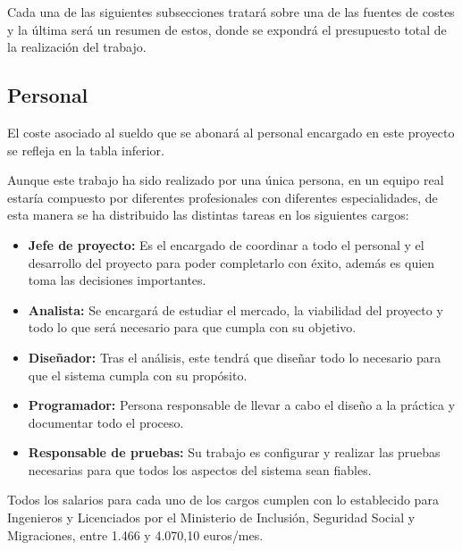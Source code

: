 Cada una de las siguientes subsecciones tratará sobre una de las fuentes de costes y la última será un resumen de estos, donde se expondrá el presupuesto total de la realización del trabajo.

\subsection{Personal}
El coste asociado al sueldo que se abonará al personal encargado en este proyecto se refleja en la tabla inferior.

Aunque este trabajo ha sido realizado por una única persona, en un equipo real estaría compuesto por diferentes profesionales con diferentes especialidades, de esta manera se ha distribuido las distintas tareas en los siguientes cargos:
\begin{itemize}
	\item \textbf{Jefe de proyecto:} Es el encargado de coordinar a todo el personal y el desarrollo del proyecto para poder completarlo con éxito, además es quien toma las decisiones importantes.
	\item \textbf{Analista:} Se encargará de estudiar el mercado, la viabilidad del proyecto y todo lo que será necesario para que cumpla con su objetivo.
	\item \textbf{Diseñador:} Tras el análisis, este tendrá que diseñar todo lo necesario para que el sistema cumpla con su propósito.
	\item \textbf{Programador:} Persona responsable de llevar a cabo el diseño a la práctica y documentar todo el proceso.
	\item \textbf{Responsable de pruebas:} Su trabajo es configurar y realizar las pruebas necesarias para que todos los aspectos del sistema sean fiables.
\end{itemize}

Todos los salarios para cada uno de los cargos cumplen con lo establecido para Ingenieros y Licenciados por el Ministerio de Inclusión, Seguridad Social y Migraciones\cite{noauthor_seguridad_nodate}, entre 1.466 y 4.070,10 euros/mes.

